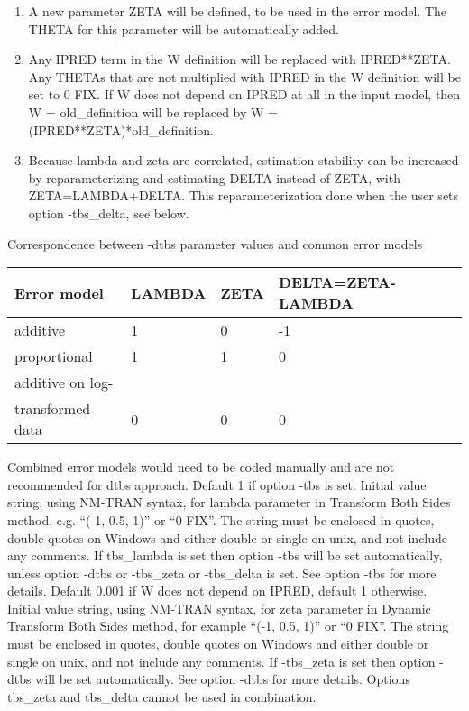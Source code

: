 \begin{optionlist}
\begin{enumerate}
\item A new parameter ZETA will be defined, to be used in the error model. The THETA for this parameter will be automatically added.
\item Any IPRED term in the W definition will be replaced with IPRED**ZETA.
Any THETAs that are not multiplied with IPRED in the W definition will be set to 0 FIX.
If W does not depend on IPRED at all in the input model, then W = old\_definition will be replaced by
W = (IPRED**ZETA)*old\_definition.
\item Because lambda and zeta are correlated, estimation stability can be increased 
by reparameterizing and estimating DELTA instead of ZETA, with ZETA=LAMBDA+DELTA. 
This reparameterization done when the user sets option -tbs\_delta, see below.
\end{enumerate}
Correspondence between -dtbs parameter values and common error models\\
\begin{tabular}{|l|l|l|l|}
\hline
Error model & LAMBDA & ZETA & DELTA=ZETA-LAMBDA\\
\hline
additive & 1 & 0 & -1 \\
\hline
proportional & 1 & 1 & 0 \\
\hline
additive on log-&  &  &  \\
transformed data & 0 & 0 & 0 \\
\hline
\end{tabular}
Combined error models would need to be coded manually and are not recommended for dtbs approach.
\nextopt
{}
Default 1 if option -tbs is set. Initial value string, using NM-TRAN syntax, for lambda parameter in Transform Both Sides method, e.g. ``(-1, 0.5, 1)'' or 
``0 FIX''. The string must be enclosed in quotes, double quotes on Windows and either double or single on unix, and not include any comments. If tbs\_lambda is set then option -tbs will be set automatically, unless option -dtbs or -tbs\_zeta or -tbs\_delta is set. 
See option -tbs for more details. 
\nextopt
{}
Default 0.001 if W does not depend on IPRED, default 1 otherwise. Initial value string, using NM-TRAN syntax, for zeta parameter in Dynamic Transform Both Sides method, for example ``(-1, 0.5, 1)'' or ``0 FIX''.
The string must be enclosed in quotes, double quotes on Windows and either double or single on unix, and not include any comments.
If -tbs\_zeta is set then option -dtbs will be set automatically. See option -dtbs for more details. Options tbs\_zeta and tbs\_delta cannot be used in combination.  

\end{optionlist}
